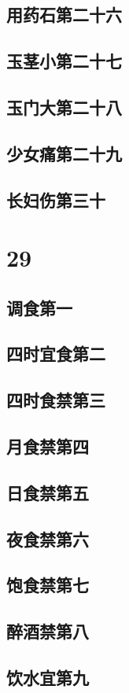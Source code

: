 \documentclass[a4paper,12pt,UTF8,twoside]{ctexbook}
\begin{document}
\chapter{用药石第二十六}
\chapter{玉茎小第二十七}
\chapter{玉门大第二十八}
\chapter{少女痛第二十九}
\chapter{长妇伤第三十}

\part{29}
\chapter{调食第一}
\chapter{四时宜食第二}
\chapter{四时食禁第三}
\chapter{月食禁第四}
\chapter{日食禁第五}
\chapter{夜食禁第六}
\chapter{饱食禁第七}
\chapter{醉酒禁第八}
\chapter{饮水宜第九}
\end{document}
